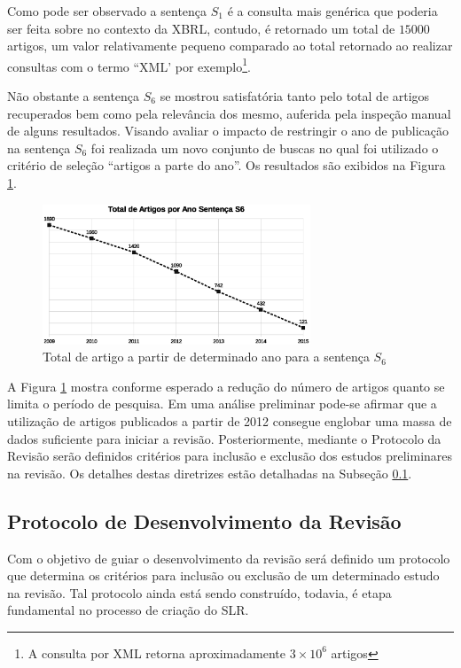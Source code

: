 \documentclass{article}
\begin{document}
Como pode ser observado a sentença $S_1$ é a consulta mais genérica
que poderia ser feita sobre no contexto da XBRL, contudo, é retornado
um total de $15000$ artigos, um valor relativamente pequeno comparado ao total retornado ao realizar consultas com o termo ``XML' por exemplo\footnote{A consulta por XML retorna aproximadamente $3 \times 10^{6}$ artigos}.

Não obstante a sentença $S_6$ se mostrou satisfatória tanto pelo total
de artigos recuperados bem como pela relevância dos mesmo, auferida
pela inspeção manual de alguns resultados. Visando avaliar o impacto
de restringir o ano de publicação na sentença $S_6$ foi realizada um
novo conjunto de buscas no qual foi utilizado o critério de seleção
``artigos a parte do ano''.  Os resultados são exibidos na Figura \ref{fig:graph_artigos_ano}{}.

\begin{figure}[h] 
\label{fig:graph_artigos_ano}
\includegraphics[width=8cm]{../img/graph_01.eps}
\caption{Total de artigo a partir de determinado ano para a sentença $S_6$}
\centering
\end{figure}

A Figura \ref{fig:graph_artigos_ano} mostra conforme esperado a
redução do número de artigos quanto se limita o período de
pesquisa. Em uma análise preliminar pode-se afirmar que a utilização
de artigos publicados a partir de 2012 consegue englobar uma massa de
dados suficiente para iniciar a revisão. Posteriormente,
mediante o Protocolo da Revisão serão definidos critérios para
inclusão e exclusão dos estudos preliminares na revisão. Os detalhes destas
diretrizes estão detalhadas na Subseção \ref{subsec:protocol}.

\subsection{Protocolo de Desenvolvimento da Revisão}
\label{subsec:protocol}

Com o objetivo de guiar o desenvolvimento da revisão será definido um
protocolo que determina os critérios para inclusão ou exclusão de um
determinado estudo na revisão. Tal protocolo ainda está sendo
construído, todavia, é etapa fundamental no processo de criação do SLR.
\end{document}
